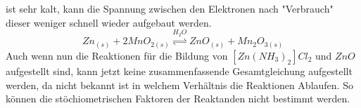 \documentclass[11pt, a4paper]{article}
\begin{document}
ist sehr kalt, kann die Spannung zwischen den Elektronen nach "Verbrauch" dieser weniger schnell wieder aufgebaut werden. $$ Zn_{(s)} + 2MnO_{2(s)} \stackrel{H_2O}{\rightleftharpoons} ZnO_{(s)} + Mn_2O_{3(s)} $$Auch wenn nun die Reaktionen für die Bildung von $[Zn(NH_3)_2]Cl_2$ und $ZnO$ aufgestellt sind, kann jetzt keine zusammenfassende Gesamtgleichung aufgestellt werden, da nicht bekannt ist in welchem Verhältnis die Reaktionen Ablaufen. So können die stöchiometrischen Faktoren der Reaktanden nicht bestimmt werden. 
\end{document}
